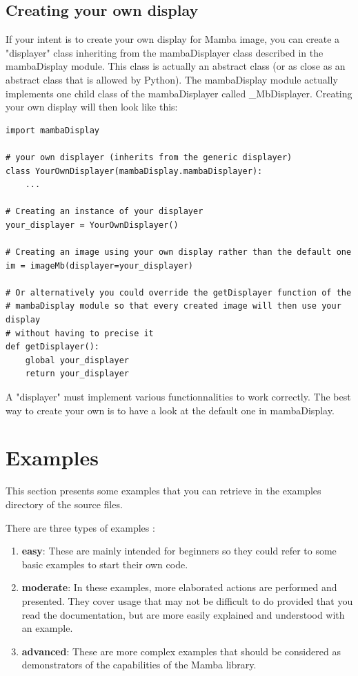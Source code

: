 \documentclass[a4paper,10pt,oneside]{article}
\begin{document}
\subsection{Creating your own display}
\label{cha:create_own_disp}

If your intent is to create your own display for Mamba image, you can create
a "displayer" class inheriting from the mambaDisplayer class described in the
mambaDisplay module. This class is actually an abstract class (or as close
as an abstract class that is allowed by Python). The mambaDisplay module
actually implements one child class of the mambaDisplayer called \_MbDisplayer.
Creating your own display will then look like this:

\lstset{language=Python}
\begin{lstlisting}
import mambaDisplay

# your own displayer (inherits from the generic displayer)
class YourOwnDisplayer(mambaDisplay.mambaDisplayer):
    ...
    
# Creating an instance of your displayer
your_displayer = YourOwnDisplayer()

# Creating an image using your own display rather than the default one
im = imageMb(displayer=your_displayer)

# Or alternatively you could override the getDisplayer function of the 
# mambaDisplay module so that every created image will then use your display
# without having to precise it
def getDisplayer():
    global your_displayer
    return your_displayer
\end{lstlisting}

A "displayer" must implement various functionnalities to work correctly. The 
best way to create your own is to have a look at the default one in mambaDisplay.

\pagebreak

\appendix
\section{Examples}
\label{cha:examples}

This section presents some examples that you can retrieve in the examples
directory of the source files.

There are three types of examples :
\begin{enumerate}
\item \textbf{easy}: These are mainly intended for beginners so they could refer
to some basic examples to start their own code.
\item \textbf{moderate}: In these examples, more elaborated actions are performed
and presented. They cover usage that may not be difficult to do provided that you
read the documentation, but are more easily explained and understood with an
example.
\item \textbf{advanced}: These are more complex examples that should be considered
as demonstrators of the capabilities of the Mamba library.
\end{enumerate}
\end{document}
